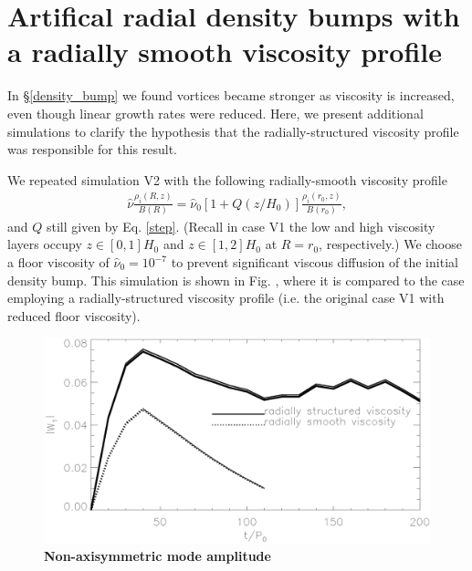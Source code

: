 {\bf
  \section{Artifical radial density bumps with a radially smooth
    viscosity profile}\label{add_sim}
  In \S\ref{density_bump} we found vortices became stronger
  as viscosity is increased, even though linear growth rates
  were reduced. Here, we present additional simulations to clarify the 
  hypothesis that the radially-structured viscosity profile was
  responsible for this result.   


  We repeated simulation V2 with the following radially-smooth
  viscosity profile      
  \begin{align}          
    \hat{\nu}\frac{\rho_i       (R,z)}{B(R)} =
    \hat{\nu}_0\left[1+Q(z/H_0) \right]\frac{\rho_i(r_0,z)}{B(r_0)},
  \end{align}                   
  and $Q$ still given by Eq. \ref{step}. (Recall in case V1 the low
  and high viscosity layers occupy $z\in[0,1]H_0$  and
  $z\in[1,2]H_0$ at $R=r_0$, respectively.) We choose a floor viscosity
  of $\hat{\nu}_0=10^{-7}$ to prevent significant viscous diffusion of 
  the initial density bump. This simulation is shown 
  in Fig. , where it is compared to the case employing a
  radially-structured viscosity profile (i.e. the original case V1
  with reduced floor viscosity). 





\begin{figure}
  \centering
  \includegraphics[width=\linewidth]{figures/pdisk_kerz_cases_appendix.ps}
  \caption{{\bf Non-axisymmetric mode amplitude}
    \label{appen}}
\end{figure}

  
}

